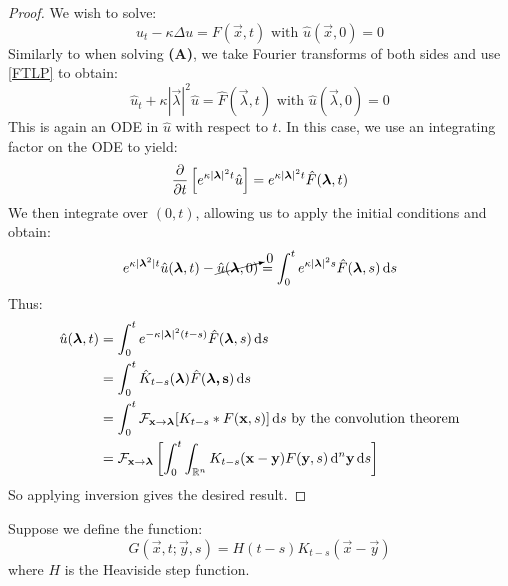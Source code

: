 \documentclass[../main.tex]{subfiles}
\begin{document}
\begin{proof}
  We wish to solve:
  \[
    u_t - \kappa \Delta u = F(\vec{x}, t) \text{ with } \hat{u}(\vec{x}, 0) = 0
  \]
  Similarly to when solving \textbf{(A)}, we take Fourier transforms of both sides and use \cref{FTLP} to obtain:
  \[
    \hat{u}_t + \kappa |\vec{\lambda}|^2 \hat{u} = \hat{F}(\vec{\lambda}, t) \text{ with } \hat{u}(\vec{\lambda}, 0) = 0
  \]
  This is again an ODE in $\hat{u}$ with respect to $t$.
  In this case, we use an integrating factor on the ODE to yield:
  \[
    \pderiv{}{t}\left[e^{\kappa |\vec{\lambda}|^2 t} \hat{u}\right] = e^{\kappa |\vec{\lambda}|^2 t} \hat{F}(\vec{\lambda}, t)
  \]
  We then integrate over $(0, t)$, allowing us to apply the initial conditions and obtain:
  \[
    e^{\kappa |\vec{\lambda}^2| t} \hat{u}(\vec{\lambda}, t) - \cancelto{0}{\hat{u}(\vec{\lambda}, 0)} = \int_{0}^{t} e^{\kappa |\vec{\lambda}|^2 s} \hat{F}(\vec{\lambda}, s) \d{s}
  \]
  Thus:
  \begin{align*}
    \hat{u}(\vec{\lambda}, t) &= \int_{0}^{t} e^{-\kappa |\vec{\lambda}|^2 (t - s)} \hat{F}(\vec{\lambda}, s) \d{s} \\
                              &= \int_{0}^{t} \hat{K}_{t - s}(\vec{\lambda}) \hat{F}(\vec{\lambda, s}) \d{s} \\
                              &= \int_{0}^{t} \mathcal{F}_{\vec{x} \to \vec{\lambda}}[K_{t - s} \ast F(\vec{x}, s)] \d{s} \text{ by the convolution theorem} \\
                              &= \mathcal{F}_{\vec{x} \to \vec{\lambda}}\left[\int_{0}^{t} \int_{\R^{n}} K_{t - s}(\vec{x} - \vec{y}) F(\vec{y}, s) \d^{n}{\vec{y}} \d{s}\right]
  \end{align*}
  So applying inversion gives the desired result.
\end{proof}
Suppose we define the function:
\[
  G(\vec{x}, t; \vec{y}, s) = H(t - s)K_{t - s}(\vec{x} - \vec{y})
\]
where $H$ is the Heaviside step function.
\end{document}

